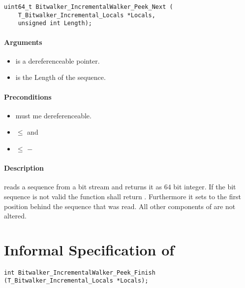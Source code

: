 \begin{lstlisting}[style=acsl-block]
uint64_t Bitwalker_IncrementalWalker_Peek_Next (
    T_Bitwalker_Incremental_Locals *Locals,
    unsigned int Length);
\end{lstlisting}


\paragraph{Arguments}
\begin{itemize}
   \item  {} is a dereferenceable pointer.
   \item {} is the Length of the sequence.
\end{itemize}

\paragraph{Preconditions}
\begin{itemize}
    \item  {} must me dereferenceable.
    \item {} $\leq$  and
    \item {} $\leq $  $-$ 
\end{itemize}

\paragraph{Description}

\peeknext reads a sequence from a bit stream and  returns it as $64$ bit integer. If the bit sequence is not valid the function shall return . Furthermore  it sets  to the first position behind the sequence that was read. All other components of  are not altered.




\clearpage

\section{Informal Specification of }

\begin{lstlisting}[style=acsl-block]
int Bitwalker_IncrementalWalker_Peek_Finish (T_Bitwalker_Incremental_Locals *Locals);
\end{lstlisting}

